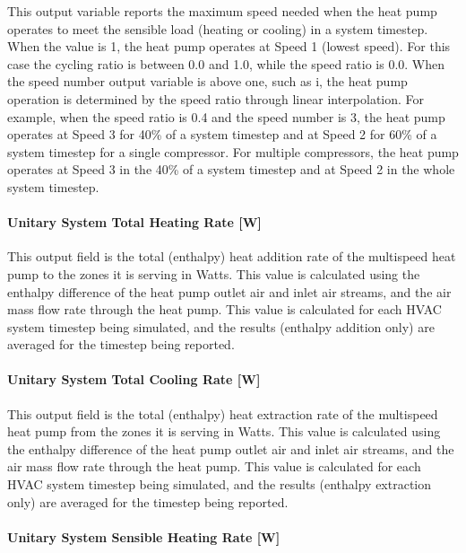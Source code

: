 This output variable reports the maximum speed needed when the heat pump operates to meet the sensible load (heating or cooling) in a system timestep. When the value is 1, the heat pump operates at Speed 1 (lowest speed). For this case the cycling ratio is between 0.0 and 1.0, while the speed ratio is 0.0. When the speed number output variable is above one, such as i, the heat pump operation is determined by the speed ratio through linear interpolation. For example, when the speed ratio is 0.4 and the speed number is 3, the heat pump operates at Speed 3 for 40\% of a system timestep and at Speed 2 for 60\% of a system timestep for a single compressor. For multiple compressors, the heat pump operates at Speed 3 in the 40\% of a system timestep and at Speed 2 in the whole system timestep.

\paragraph{Unitary System Total Heating Rate {[}W{]}}\label{unitary-system-total-heating-rate-w-1}

This output field is the total (enthalpy) heat addition rate of the multispeed heat pump to the zones it is serving in Watts. This value is calculated using the enthalpy difference of the heat pump outlet air and inlet air streams, and the air mass flow rate through the heat pump. This value is calculated for each HVAC system timestep being simulated, and the results (enthalpy addition only) are averaged for the timestep being reported.

\paragraph{Unitary System Total Cooling Rate {[}W{]}}\label{unitary-system-total-cooling-rate-w-1}

This output field is the total (enthalpy) heat extraction rate of the multispeed heat pump from the zones it is serving in Watts. This value is calculated using the enthalpy difference of the heat pump outlet air and inlet air streams, and the air mass flow rate through the heat pump. This value is calculated for each HVAC system timestep being simulated, and the results (enthalpy extraction only) are averaged for the timestep being reported.

\paragraph{Unitary System Sensible Heating Rate {[}W{]}}\label{unitary-system-sensible-heating-rate-w-1}

